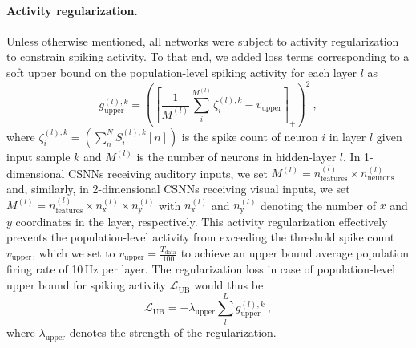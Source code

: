\documentclass[11pt,a4paper]{article}
\begin{document}
\paragraph{Activity regularization.}
Unless otherwise mentioned, all networks were subject to activity regularization to constrain spiking activity. 
To that end, we added loss terms corresponding to a soft upper bound on the population-level spiking activity for each layer $l$ as
\begin{equation}
	g^{(l),k}_{\text{upper}} = \left( \left[\frac{1}{M^{(l)}} \sum_i^{M^{(l)}}
\zeta_i^{(l),k} - v_{\text{upper}} \right]_+ \right)^2~,
\end{equation}
where $\zeta_i^{(l), k} = \left( \sum_n^N S_i^{(l), k}[n]\right)$ is the spike count of neuron $i$ in layer $l$ given input sample $k$ and $M^{(l)}$ is the number of neurons in hidden-layer $l$.
In 1-dimensional \acp{CSNN} receiving auditory inputs, we set $M^{(l)} = n_{\text{features}}^{(l)} \times n_{\text{neurons}}^{(l)}$ and, similarly, in 2-dimensional \acp{CSNN} receiving visual inputs, we set $M^{(l)} = n_{\text{features}}^{(l)} \times n_{\text{x}}^{(l)} \times n_{\text{y}}^{(l)}$ with  $n_{\text{x}}^{(l)}$ and $n_{\text{y}}^{(l)}$ denoting the number of $x$ and $y$ coordinates in the layer, respectively.
This activity regularization effectively prevents the population-level activity from exceeding the threshold spike count $v_{\text{upper}}$, which we set to $v_{\text{upper}} = \frac{T_{\text{data}}}{100}$ to achieve an upper bound average population firing rate of 10\,Hz per layer.
The regularization loss in case of population-level upper bound for spiking activity $\mathcal{L}_{\text{UB}}$ would thus be
\begin{equation}
\mathcal{L}_{\text{UB}} = -\lambda_{\text{upper}} \sum_l^L
g^{(l),k}_{\text{upper}}~,
\end{equation}
where $\lambda_{\text{upper}}$ denotes the strength of the regularization.
\end{document}
